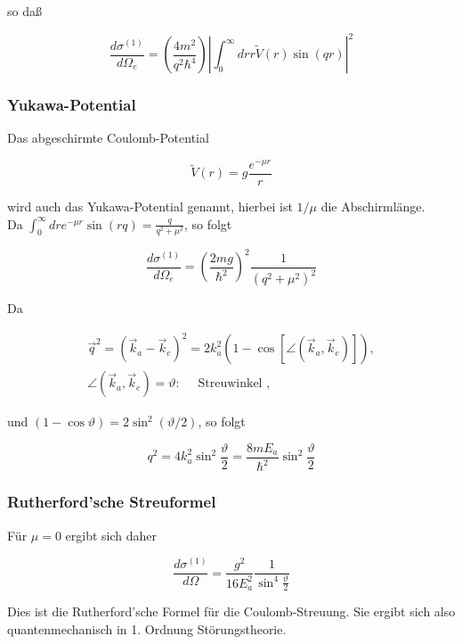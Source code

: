 \documentclass[10pt, letterpaper]{article}
\begin{document}
so daß

$$
\frac{d \sigma^{(1)}}{d \Omega_{e}}=\left(\frac{4 m^{2}}{q^{2} \hbar^{4}}\right)\left|\int_{0}^{\infty} d r r \tilde{V}(r) \sin (q r)\right|^{2}
$$

\subsubsection*{Yukawa-Potential}
Das abgeschirmte Coulomb-Potential

$$
\tilde{V}(r)=g \frac{e^{-\mu r}}{r}
$$

wird auch das Yukawa-Potential genannt, hierbei ist $1 / \mu$ die Abschirmlänge.\\
Da $\int_{0}^{\infty} d r e^{-\mu r} \sin (r q)=\frac{q}{q^{2}+\mu^{2}}$, so folgt

$$
\frac{d \sigma^{(1)}}{d \Omega_{e}}=\left(\frac{2 m g}{\hbar^{2}}\right)^{2} \frac{1}{\left(q^{2}+\mu^{2}\right)^{2}}
$$

Da

$$
\begin{gathered}
\vec{q}^{2}=\left(\vec{k}_{a}-\vec{k}_{e}\right)^{2}=2 k_{a}^{2}\left(1-\cos \left[\angle\left(\vec{k}_{a}, \vec{k}_{e}\right)\right]\right), \\
\angle\left(\vec{k}_{a}, \vec{k}_{e}\right)=\vartheta: \quad \text { Streuwinkel },
\end{gathered}
$$

und $(1-\cos \vartheta)=2 \sin ^{2}(\vartheta / 2)$, so folgt

$$
q^{2}=4 k_{a}^{2} \sin ^{2} \frac{\vartheta}{2}=\frac{8 m E_{a}}{\hbar^{2}} \sin ^{2} \frac{\vartheta}{2}
$$

\subsubsection*{Rutherford'sche Streuformel}
Für $\mu=0$ ergibt sich daher

$$
\frac{d \sigma^{(1)}}{d \Omega}=\frac{g^{2}}{16 E_{a}^{2}} \frac{1}{\sin ^{4} \frac{\vartheta}{2}}
$$

Dies ist die Rutherford'sche Formel für die Coulomb-Streuung. Sie ergibt sich also quantenmechanisch in 1. Ordnung Störungstheorie.
\end{document}
